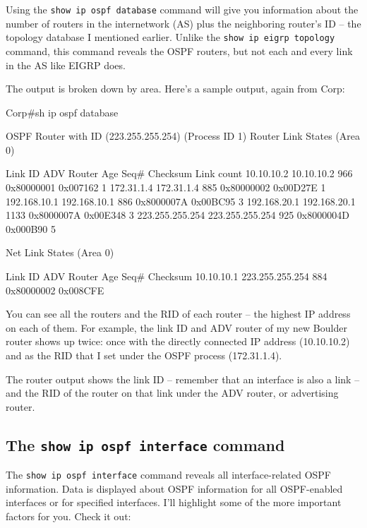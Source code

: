 Using the \texttt{show\ ip\ ospf\ database} command will give you
information about the number of routers in the internetwork (AS) plus
the neighboring router's ID -- the topology database I mentioned earlier.
Unlike the \texttt{show\ ip\ eigrp\ topology} command, this command
reveals the OSPF routers, but not each and every link in the AS like
EIGRP does.

The output is broken down by area. Here's a sample output, again from
Corp:

\begin{cli}
Corp#sh ip ospf database

                OSPF Router with ID (223.255.255.254) (Process ID 1)
Router Link States (Area 0)

Link ID         ADV Router      Age         Seq#       Checksum Link count
10.10.10.2      10.10.10.2      966         0x80000001 0x007162 1
172.31.1.4      172.31.1.4      885         0x80000002 0x00D27E 1
192.168.10.1    192.168.10.1    886         0x8000007A 0x00BC95 3
192.168.20.1    192.168.20.1    1133        0x8000007A 0x00E348 3
223.255.255.254 223.255.255.254 925         0x8000004D 0x000B90 5

                Net Link States (Area 0)

Link ID         ADV Router      Age         Seq#       Checksum
10.10.10.1      223.255.255.254 884         0x80000002 0x008CFE
\end{cli}

You can see all the routers and the RID of each router -- the highest IP address on each of
them. For example, the link ID and ADV router of my new Boulder router
shows up twice: once with the directly connected IP address (10.10.10.2)
and as the RID that I set under the OSPF process (172.31.1.4).

The router output shows the link ID -- remember that an interface is also
a link -- and the RID of the router on that link under the ADV router, or
advertising router.

\subsection{The \texttt{show ip ospf interface} command}

The \texttt{show\ ip\ ospf\ interface} command reveals all
interface-related OSPF information. Data is displayed about OSPF
information for all OSPF-enabled interfaces or for specified interfaces.
I'll highlight some of the more important factors for you. Check it out:

